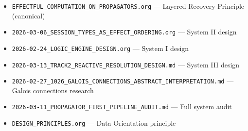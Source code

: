 \documentclass[11pt]{article}
\begin{document}
\begin{itemize}
\item \texttt{EFFECTFUL\_COMPUTATION\_ON\_PROPAGATORS.org} — Layered Recovery Principle (canonical)
\item \texttt{2026-03-06\_SESSION\_TYPES\_AS\_EFFECT\_ORDERING.org} — System II design
\item \texttt{2026-02-24\_LOGIC\_ENGINE\_DESIGN.org} — System I design
\item \texttt{2026-03-13\_TRACK2\_REACTIVE\_RESOLUTION\_DESIGN.md} — System III design
\item \texttt{2026-02-27\_1026\_GALOIS\_CONNECTIONS\_ABSTRACT\_INTERPRETATION.md} — Galois connections research
\item \texttt{2026-03-11\_PROPAGATOR\_FIRST\_PIPELINE\_AUDIT.md} — Full system audit
\item \texttt{DESIGN\_PRINCIPLES.org} — Data Orientation principle
\end{itemize}
\end{document}
